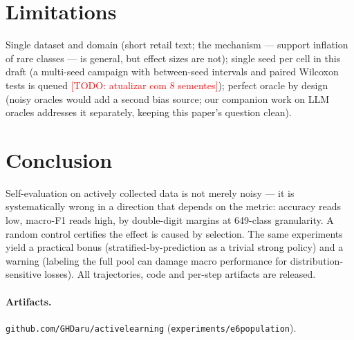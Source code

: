 \documentclass[11pt]{article}
\newcommand{\todo}[1]{\textcolor{red}{[TODO: #1]}}
\begin{document}
\section{Limitations}
\label{sec:limits}

Single dataset and domain (short retail text; the mechanism --- support
inflation of rare classes --- is general, but effect sizes are not);
single seed per cell in this draft (a multi-seed campaign with
between-seed intervals and paired Wilcoxon tests is queued
\todo{atualizar com 8 sementes}); perfect oracle by design (noisy oracles
would add a second bias source; our companion work on LLM oracles
addresses it separately, keeping this paper's question clean).

\section{Conclusion}
\label{sec:conclusion}

Self-evaluation on actively collected data is not merely noisy --- it is
systematically wrong in a direction that depends on the metric: accuracy
reads low, macro-F1 reads high, by double-digit margins at 649-class
granularity. A random control certifies the effect is caused by selection.
The same experiments yield a practical bonus (stratified-by-prediction as
a trivial strong policy) and a warning (labeling the full pool can damage
macro performance for distribution-sensitive losses). All trajectories,
code and per-step artifacts are released.

\paragraph{Artifacts.} \texttt{github.com/GHDaru/activelearning}
(\texttt{experiments/e6population}).



\end{document}
